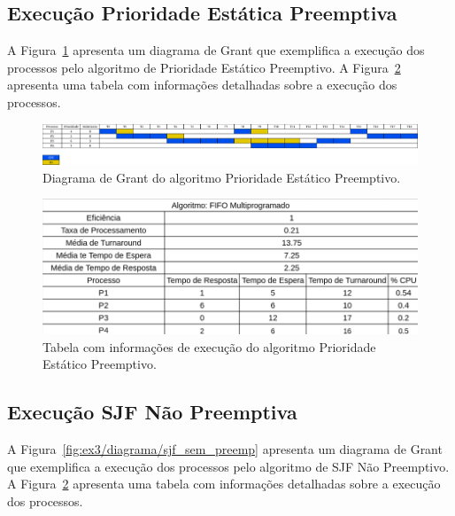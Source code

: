 \documentclass[
	12pt,				%
	oneside,   	        %
	a4paper,			%
	english,			%
	french,				%
	spanish,			%
	brazil,				%
	]{pacotes/abntex2}
\begin{document}
\subsection{Execução Prioridade Estática Preemptiva}
\label{subsubsec:prio_preemp}

A Figura~\ref{fig:ex3/diagrama/prio_preemp} apresenta um diagrama de Grant que exemplifica a execução dos processos pelo algoritmo de Prioridade Estático Preemptivo. A Figura~\ref{fig:ex3/tabela/prio_preemp} apresenta uma tabela com informações detalhadas sobre a execução dos processos.

\begin{figure}[H]
  \centering
  \includegraphics[scale=0.20]{figuras/ex3/diagrama/prio_sem_preemp.png}
  \caption{Diagrama de Grant do algoritmo Prioridade Estático Preemptivo.}
  \label{fig:ex3/diagrama/prio_preemp}
\end{figure}

\begin{figure}[H]
  \centering
  \includegraphics[scale=0.5]{figuras/ex3/tabela/fifo_multi.png}
  \caption{Tabela com informações de execução do algoritmo Prioridade Estático Preemptivo.}
  \label{fig:ex3/tabela/prio_preemp}
\end{figure}

\subsection{Execução SJF Não Preemptiva}
\label{subsubsec:sjf_sem_preemp}

A Figura~\ref{fig:ex3/diagrama/sjf_sem_preemp} apresenta um diagrama de Grant que exemplifica a execução dos processos pelo algoritmo de SJF Não Preemptivo. A Figura~\ref{fig:ex3/tabela/prio_preemp} apresenta uma tabela com informações detalhadas sobre a execução dos processos.
\end{document}
